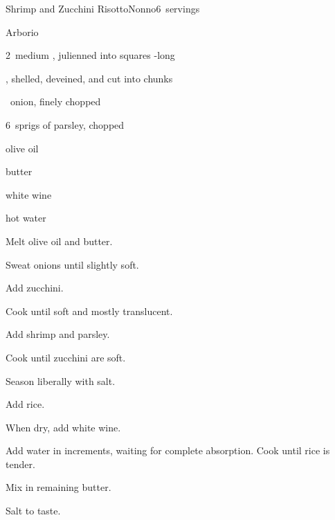 \begin{recipe}{Shrimp and Zucchini Risotto}{Nonno}{6~servings}

\begin{ingredients}
\item {} Arborio 
\item 2~medium , julienned into \inch{\quarter} squares -long
\item {} , shelled, deveined, and cut into chunks
\item \half{}~onion, finely chopped
\item 6~sprigs of parsley, chopped
\item {} olive oil
\item {} butter
\item \C{\half} white wine
\item hot water
\end{ingredients}

\begin{directions}
\item Melt olive oil and butter.
\item Sweat onions until slightly soft.
\item Add zucchini.
\item Cook until soft and mostly translucent.
\item Add shrimp and parsley.
\item Cook until zucchini are soft.
\item Season liberally with salt.
\item Add rice.
\item When dry, add white wine.
\item Add water in \C{\half} increments, waiting for complete absorption. Cook until rice is tender.
\item Mix in remaining butter.
\item Salt to taste.
\end{directions}

\end{recipe}

